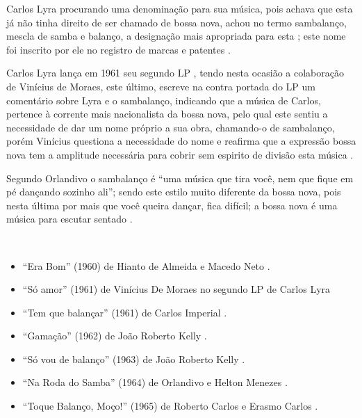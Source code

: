 Carlos Lyra procurando uma denominação para sua música, 
pois achava que esta já não tinha direito de ser chamado de bossa nova,
achou no termo sambalanço, mescla de samba e balanço, a designação mais apropriada para esta \cite{castro2011bossa};
este nome foi inscrito por ele no registro de marcas e patentes \cite[pp. 127]{vianna1999bezerra} \cite{castro2011bossa}.


Carlos Lyra lança em 1961  seu segundo LP \cite[pp. 142]{lyrasongbook}  \cite{castro2011bossa}, 
tendo nesta ocasião a colaboração de Vinícius de Moraes,
este último, escreve na contra portada do LP um comentário sobre Lyra e o sambalanço,
indicando que a música de Carlos, pertence à corrente mais nacionalista da bossa nova,
pelo qual este sentiu a necessidade de dar um nome próprio a sua obra, 
chamando-o de sambalanço, 
porém Vinícius questiona a necessidade do nome e reafirma que a expressão 
 bossa nova tem a amplitude necessária para cobrir sem espirito de divisão esta música \cite{castro2011bossa}.

Segundo Orlandivo o sambalanço é ``uma música que tira você, nem que fique em pé dançando sozinho ali'';
sendo este estilo muito diferente da bossa nova, pois nesta última por mais que você queira dançar, fica difícil;
a bossa nova é uma música para escutar sentado \cite{de2017sambalanco}.
\begin{example} ~

\begin{itemize}
\item ``Era Bom'' (1960) de Hianto de Almeida e Macedo Neto  \cite[pp. 123]{de2003tem}.
\item ``Só amor'' (1961) de Vinícius De Moraes no segundo LP de Carlos Lyra \cite[pp. 142]{lyrasongbook}  
\item ``Tem que balançar'' (1961) de Carlos Imperial  \cite{de2017sambalanco}.
\item ``Gamação'' (1962) de João Roberto Kelly \cite[pp. 122]{de2003tem}.
\item ``Só vou de balanço'' (1963) de João Roberto Kelly \cite{de2017sambalanco}.
\item ``Na Roda do Samba'' (1964) de Orlandivo e Helton Menezes \cite{de2017sambalanco} \cite[pp. 122]{de2003tem}.
\item ``Toque Balanço, Moço!'' (1965) de Roberto Carlos e Erasmo Carlos \cite{de2017sambalanco} \cite[pp. 123]{de2003tem}.
\end{itemize}
\end{example}

